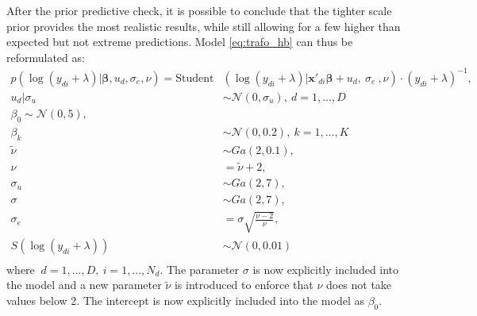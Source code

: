 After the prior predictive check, it is possible to conclude that the tighter scale prior provides the most realistic results, while still allowing for a few higher than expected but not extreme predictions.
Model \ref{eq:trafo_hb} can thus be reformulated as:
\begin{equation}
    \begin{split}
        p(\log(y_{di} + \lambda) |\boldsymbol \beta, u_d, \sigma_e, \nu)   =        \text{Student}&(\log(y_{di} + \lambda)| \boldsymbol{x'}_{di} \boldsymbol \beta + u_d,\ \sigma_e\ , \nu)\cdot (y_{di} + \lambda)^{-1}, \\
        u_d | \sigma_u & \sim \mathcal N(0, \sigma_u),\ d = 1, ..., D \\
        \beta_0 \sim \mathcal N (0, 5),\\
        \beta_k & \sim \mathcal N(0, 0.2),\ k = 1, ..., K\\
        \tilde \nu & \sim Ga(2, 0.1), \\
        \nu & = \tilde \nu + 2,\\
        \sigma_u & \sim Ga(2, 7), \\
        \sigma & \sim Ga(2, 7), \\
        \sigma_e & = \sigma \sqrt{\frac{\nu - 2}{\nu}},\\
        S(\log(y_{di} + \lambda)) & \sim \mathcal N(0, 0.01)\\
    \end{split}
    \label{eq:trafo_coef_var}
\end{equation}
where $\ d = 1, ..., D,\ i = 1, ..., N_d$. The parameter $\sigma$ is now explicitly included into the model and a new parameter $\tilde \nu$ is introduced to enforce that $\nu$ does not take values below 2. The intercept is now explicitly included into the model as $\beta_0$.






